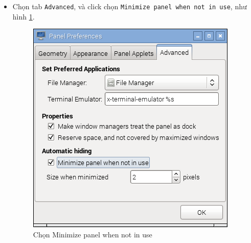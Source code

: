 \documentclass[12pt,a4paper]{article}
\begin{document}
\begin{itemize}
\begin{itemize}
				\item Chọn tab \verb|Advanced|, và click chọn \verb|Minimize panel when not in use|, như hình \ref{Fig:hide-task-bar}.
				\begin{figure}[!h]
					\begin{center}
						\includegraphics[scale=.35]{hide-task-bar.png} 
					\end{center}
					\caption{Chọn Minimize panel when not in use}\label{Fig:hide-task-bar}
				\end{figure}
			\end{itemize}
	\end{itemize}
\end{document}
